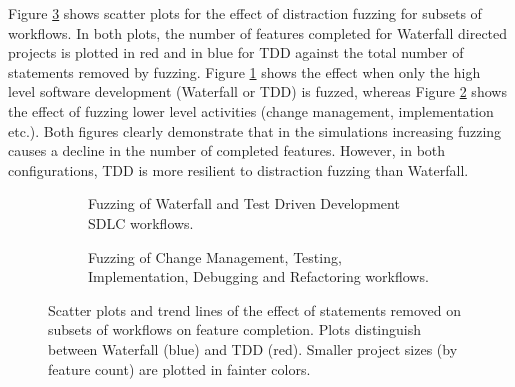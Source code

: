 \documentclass{llncs}
\begin{document}
Figure \ref{fig:fuzzing-features} shows scatter plots for the effect of distraction fuzzing for subsets of workflows.
In both plots, the number of features completed for Waterfall directed projects is plotted in red and in blue for TDD
against the total number of statements removed by fuzzing.  Figure \ref{fig:fuzzing-features:WT} shows the effect when
only the high level software development (Waterfall or TDD) is fuzzed, whereas Figure \ref{fig:fuzzing-features:CTIDR}
shows the effect of fuzzing lower level activities (change management, implementation etc.).  Both figures clearly
demonstrate that in the simulations increasing fuzzing causes a decline in the number of completed features.  However,
in both configurations, TDD is more resilient to distraction fuzzing than Waterfall.

\begin{figure}
  \centering
  \begin{subfigure}{2.3in}
    \caption{Fuzzing of Waterfall and Test Driven Development SDLC workflows.}
    \label{fig:fuzzing-features:WT}
  
  \end{subfigure}
  \hfill
  \begin{subfigure}{2.3in}
    \caption{Fuzzing of Change Management, Testing, Implementation, Debugging and Refactoring workflows.}  
  \label{fig:fuzzing-features:CTIDR}
  \end{subfigure}
  
  \caption{Scatter plots and trend lines of the effect of statements removed on subsets of workflows on feature
    completion. Plots distinguish between Waterfall (blue) and TDD (red).  Smaller project sizes (by feature count) are
    plotted in fainter colors.}
  \label{fig:fuzzing-features}
\end{figure}
\end{document}
